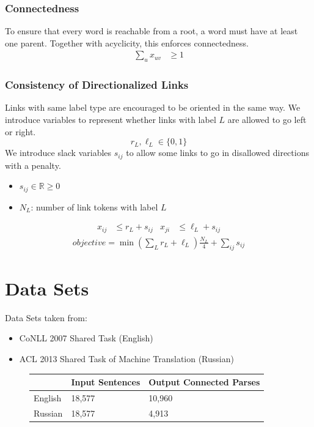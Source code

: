 \documentclass[a0,landscape]{a0poster}
\begin{document}
\begin{multicols}{4}
\subsubsection*{Connectedness}
To ensure that every word is reachable from a root, a word must have at least one parent. Together with acyclicity, this enforces connectedness.
\begin{align}
  \sum_u x_{uv} & \geq 1 
\end{align}


\subsubsection*{Consistency of Directionalized Links}
Links with same label type are encouraged to be oriented in the same way. We introduce variables to represent whether links with label $L$ are allowed to go left or right.
$$r_L, \ell_L \in \{0,1\}$$
We introduce slack variables $s_{ij}$ to allow some links to go in disallowed directions with a penalty.
\begin{itemize}  
\item[] $s_{ij} \in \mathbb{R} \geq 0$
\item[] $N_L$: number of link tokens with label $L$
\end{itemize}
\begin{align}\label{direction+slack}
  x_{ij} &\leq r_L + s_{ij} &
  x_{ji} &\leq \ell_L + s_{ij}
\end{align}
\begin{align}\label{eqn:obj}
  objective = \min \left( \sum_L r_L + \ell_L \right) \frac{N_L}{4} + \sum_{ij}s_{ij}
\end{align}







\section*{Data Sets}
Data Sets taken from:
\begin{itemize}
\item[] CoNLL 2007 Shared Task (English)
\item[] ACL 2013 Shared Task of Machine Translation (Russian)
\end{itemize}
\begin{figure}[H]
  \centering
  \begin{tabular}{|l|l|l|}
    \hline
    & Input Sentences & Output Connected Parses \\ \hline
    English  & 18,577        & 10,960               \\ \hline
    Russian & 18,577        & 4,913                \\ \hline
  \end{tabular}
\end{figure}


\end{multicols}
\end{document}
